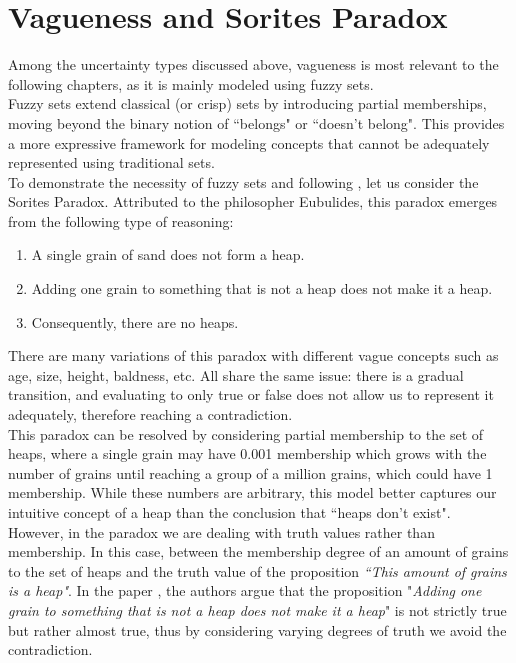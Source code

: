 \section{Vagueness and Sorites Paradox}
\label{sec:sorites}

Among the uncertainty types discussed above, vagueness is most relevant to the following chapters, as it is mainly modeled using fuzzy sets.\\

Fuzzy sets extend classical (or crisp) sets by introducing partial memberships, moving beyond the binary notion of ``belongs" or ``doesn't belong". This provides a more expressive framework for modeling concepts that cannot be adequately represented using traditional sets.\\

To demonstrate the necessity of fuzzy sets and following \cite{HájekSorites}, let us consider the Sorites Paradox. Attributed to the philosopher Eubulides, this paradox emerges from the following type of reasoning:

\begin{enumerate}
    \item A single grain of sand does not form a heap.
    \item Adding one grain to something that is not a heap does not make it a heap.
    \item Consequently, there are no heaps.
\end{enumerate}


There are many variations of this paradox with different vague concepts such as age, size, height, baldness, etc. All share the same issue: there is a gradual transition, and evaluating to only true or false does not allow us to represent it adequately, therefore reaching a contradiction.\\

This paradox can be resolved by considering partial membership to the set of heaps, where a single grain may have 0.001 membership which grows with the number of grains until reaching a group of a million grains, which could have 1 membership. While these numbers are arbitrary, this model better captures our intuitive concept of a heap than the conclusion that ``heaps don't exist".\\

However, in the paradox we are dealing with truth values rather than membership. In this case,  between the membership degree of an amount of grains to the set of heaps and the truth value of the proposition \textit{``This amount of grains is a heap"}. In the paper \cite{HájekSorites}, the authors argue that the proposition "\textit{Adding one grain to something that is not a heap does not make it a heap}" is not strictly true but rather almost true, thus by considering varying degrees of truth we avoid the contradiction.\\

